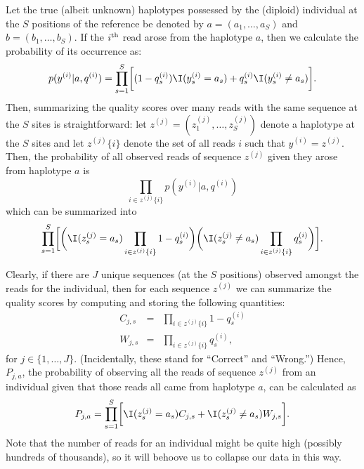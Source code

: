  Let the true (albeit unknown) haplotypes possessed by
 the (diploid) individual at the $S$ positions of the reference
 be denoted by $a = (a_1,\ldots, a_S)$ and $b = (b_1,\ldots,b_S)$.  If the $i^\mathrm{th}$ read arose
 from the haplotype $a$, then we calculate the probability of its occurrence as:
 \[
 p(y^{(i)}|a, q^{(i)}) = \prod_{s=1}^S \biggl[ (1-q^{(i)}_s)\I(y^{(i)}_s = a_s) +  
 q^{(i)}_s\I(y^{(i)}_s \neq a_s)\biggr].
 \]
 Then, summarizing the quality scores over many reads with the same
 sequence at the $S$ sites is straightforward: let $z^{(j)} = (z_1^{(j)},\ldots,z_S^{(j)})$ denote a haplotype 
at the $S$ sites and let $z^{(j)}\{i\}$ denote the set of all reads $i$ such that $y^{(i)} = z^{(j)}$.
 Then, the probability of all observed reads of sequence $z^{(j)}$ given they 
 arose from haplotype $a$ is
 \[
\prod_{i\in z^{(j)}\{i\}} p(y^{(i)}|a, q^{(i)})
 \]
 which can be summarized into
 \[
 \prod_{s=1}^S \biggl[ \biggl(\I(z^{(j)}_s = a_s)\prod_{i\in z^{(j)}\{i\}}1-q^{(i)}_s\biggr)
 \biggl(\I(z^{(j)}_s \neq a_s)\prod_{i\in z^{(j)}\{i\}} q^{(i)}_s\biggr) \biggr].
 \]

Clearly, if there are $J$ unique sequences (at the $S$ positions) observed
amongst the reads for the individual, then for each sequence $z^{(j)}$ 
we can summarize the quality scores by computing and storing the following
quantities:
\begin{eqnarray*}
C_{j,s} & = & \prod_{i\in z^{(j)}\{i\}}1-q^{(i)}_s \\
W_{j,s} & = & \prod_{i\in z^{(j)}\{i\}} q^{(i)}_s,
\end{eqnarray*}
for $j \in \{1,\ldots, J\}$.  
(Incidentally, these stand for ``Correct'' and ``Wrong.'') Hence, $P_{j,a}$,
the probability of observing all the reads of sequence $z^{(j)}$ from an individual
given that those reads all came from haplotype $a$, can be calculated as
\begin{equation}
P_{j,a} =  \prod_{s=1}^S\biggl[ \I(z_s^{(j)} = a_s)C_{j,s} + 
 \I(z_s^{(j)} \neq a_s) W_{j,s} \biggr].
 \label{eq:pja}
\end{equation}
Note that the number of reads for an individual might be quite high (possibly hundreds of
thousands), so it will behoove us to collapse our data in this way.

